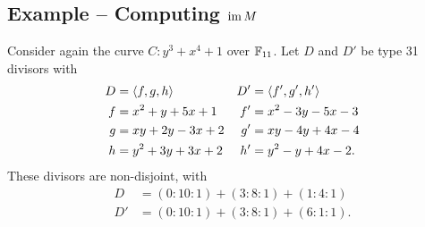 \begin{comment}
Now we have $L$ and $G$ of degrees 5 and 1, respectively, such that $D + D' = L + G$.
To finish, we must compute the reduction $\bar{\bar L}$ of $L$ and compute $D + D' = \bar{\bar L} + G$.
The reduction $\bar{\bar L}$ will be of type 31, thus the problem of adding $D$ and $D'$
is reduced to adding a degree 3 divisor $\bar{\bar L}$ with a degree 1 divisor $G$.
\end{comment}



\subsection{Example -- Computing $\operatorname{im} M$}

Consider again the curve $C : y^3 + x^4 + 1$ over $\mathbb{F}_{11}$.
Let $D$ and $D'$ be type 31 divisors with
\begin{align*}
  D  &= \left\langle f, g, h \right\rangle      & D' &= \left\langle f', g', h' \right\rangle  \\
  f  &= x^2 +  y + 5x + 1  & f' &= x^2 - 3y - 5x - 3 \\
  g  &=  xy + 2y - 3x + 2  & g' &=  xy - 4y + 4x - 4 \\
  h  &= y^2 + 3y + 3x + 2  & h' &= y^2 -  y + 4x - 2.
\end{align*}
These divisors are non-disjoint, with
\begin{align*}
  D  &= (0 : 10 : 1) + (3 : 8 : 1) + (1 : 4 : 1) \\
  D' &= (0 : 10 : 1) + (3 : 8 : 1) + (6 : 1 : 1).
\end{align*}

